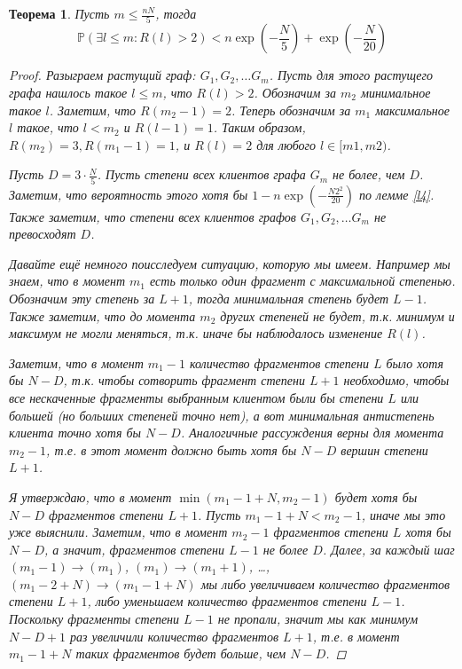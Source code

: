 \documentclass{matmex-diploma-custom}
\newcommand{\PRob}{\mathbb P}
\newcommand{\leqs}{\leqslant}
\newtheorem{theorem}{Теорема}
\theoremstyle{named}
\begin{document}
\begin{theorem}
Пусть $m \leqs \frac{nN}{5}$, тогда
\begin{equation}
\PRob\left(\exists l \leqs m : R(l) > 2 \right) < n\exp\left(-\frac{N}{5}\right) +  \exp\left(- \frac{N}{20}\right)
\end{equation}

\begin{proof}
Разыграем растущий граф: $G_1, G_2, \dots G_m$. Пусть для этого растущего графа нашлось такое $l \leqs m$, что $ R(l) > 2$.
Обозначим за $m_2$ минимальное такое $l$. Заметим, что $R(m_2 - 1) = 2$. 
Теперь обозначим за $m_1$ максимальное $l$ такое, что $l < m_2$ и $R(l-1) = 1$.
Таким образом, $R(m_2) = 3, R(m_1 - 1) = 1$, и $R(l) = 2$ для любого $l \in [m1, m2)$.

Пусть $D = 3 \cdot \frac{N}{5}$. Пусть степени всех клиентов графа $G_m$ не более, чем $D$. 
Заметим, что вероятность этого хотя бы $1 -  n\exp\left(-\frac{N 2^2}{20}\right)$ по лемме \ref{l4}.
Также заметим, что степени всех клиентов графов $G_1, G_2, \dots G_m$ не превосходят $D$.

Давайте ещё немного поисследуем ситуацию, которую мы имеем. Например мы знаем, что в момент $m_1$ есть 
только один фрагмент с максимальной степенью. Обозначим эту степень за $L + 1$, тогда минимальная степень будет $L - 1$.
Также заметим, что до момента $m_2$ других степеней не будет, т.к. минимум и максимум не могли меняться, т.к. иначе бы 
наблюдалось изменение $R(l)$. 

Заметим, что в момент $m_1 - 1$ 
количество фрагментов степени $L$ было хотя бы $N-D$, т.к. чтобы сотворить фрагмент степени $L+1$ необходимо, 
чтобы все нескаченные фрагменты выбранным клиентом были бы степени $L$ или большей (но больших степеней точно нет), а вот минимальная антистепень 
клиента точно хотя бы $N - D$. Аналогичные рассуждения верны для момента $m_2 - 1$, т.е. в этот момент должно быть хотя бы $N - D$
вершин степени $L+1$. 

Я утверждаю, что в момент $\min(m_1 - 1 + N, m_2 - 1)$ будет хотя бы $N-D$ фрагментов степени $L+1$.
Пусть $m_1 - 1 + N < m_2 - 1$, иначе мы это уже выяснили.
Заметим, что в момент $m_2 - 1$ фрагментов степени $L$ хотя бы $N-D$, а значит,
фрагментов степени $L - 1$ не более $D$. Далее, за каждый шаг $(m_1 - 1) \to (m_1)$, $(m_1) \to (m_1 + 1)$, \dots, 
$(m_1 - 2 + N) \to (m_1 - 1 + N)$
 мы либо увеличиваем количество фрагментов степени $L+1$, либо уменьшаем количество фрагментов степени $L-1$.
Поскольку фрагменты степени $L-1$ не пропали, значит мы как минимум $N-D + 1$ раз увеличили количество фрагментов $L+1$, 
т.е. в момент $m_1 - 1 + N$ таких фрагментов будет больше, чем $N - D$.


\end{proof}
\end{theorem}
\end{document}

